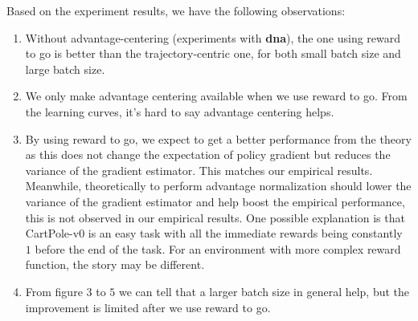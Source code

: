 \documentclass[a4paper]{article}
\theoremstyle{definition}
\begin{document}
Based on the experiment results, we have the following observations:
\begin{enumerate}
\item Without advantage-centering (experiments with \textbf{dna}), the one using reward to go is better than the trajectory-centric one, for both small batch size and large batch size.
\item We only make advantage centering available when we use reward to go. From the learning curves, it's hard to say advantage centering helps.
\item By using reward to go, we expect to get a better performance from the theory as this does not change the expectation of policy gradient but reduces the variance of the gradient estimator. This matches our empirical results. Meanwhile, theoretically to perform advantage normalization should lower the variance of the gradient estimator and help boost the empirical performance, this is not observed in our empirical results. One possible explanation is that CartPole-v0 is an easy task with all the immediate rewards being constantly $1$ before the end of the task. For an environment with more complex reward function, the story may be different.
\item From figure $3$ to $5$ we can tell that a larger batch size in general help, but the improvement is limited after we use reward to go.
\end{enumerate}
\end{document}

